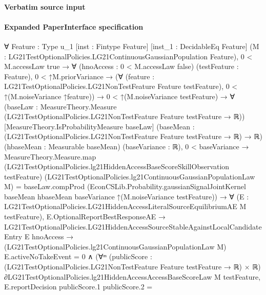 \documentclass[10pt]{article}
\begin{document}
\paragraph{Verbatim source input}
\begin{ReviewVerbatim}
\end{ReviewVerbatim}


\paragraph{Expanded PaperInterface specification}
\begin{ReviewVerbatim}
∀ {Feature : Type u_1} [inst : Fintype Feature] [inst_1 : DecidableEq Feature]
  (M : LG21TestOptionalPolicies.LG21ContinuousGaussianPopulation Feature),
  0 < M.accessLaw {true} →
    ∀ (hnoAccess : 0 < M.accessLaw {false}) (testFeature : Feature),
      0 < ↑M.priorVariance →
        (∀ (feature : LG21TestOptionalPolicies.LG21NonTestFeature Feature testFeature),
            0 < ↑(M.noiseVariance ↑feature)) →
          0 < ↑(M.noiseVariance testFeature) →
            ∀ (baseLaw : MeasureTheory.Measure (LG21TestOptionalPolicies.LG21NonTestFeature Feature testFeature → ℝ))
              [MeasureTheory.IsProbabilityMeasure baseLaw]
              (baseMean : (LG21TestOptionalPolicies.LG21NonTestFeature Feature testFeature → ℝ) → ℝ)
              (hbaseMean : Measurable baseMean) (baseVariance : ℝ),
              0 < baseVariance →
                MeasureTheory.Measure.map
                      (LG21TestOptionalPolicies.lg21HiddenAccessBaseScoreSkillObservation testFeature)
                      (LG21TestOptionalPolicies.lg21ContinuousGaussianPopulationLaw M) =
                    baseLaw.compProd
                      (EconCSLib.Probability.gaussianSignalJointKernel baseMean hbaseMean baseVariance
                        ↑(M.noiseVariance testFeature)) →
                  ∀ (E : LG21TestOptionalPolicies.LG21HiddenAccessLiteralSourceEquilibriumAE M testFeature),
                    E.OptionalReportBestResponseAE →
                      LG21TestOptionalPolicies.LG21HiddenAccessSourceStableAgainstLocalCandidateEntry E hnoAccess →
                        (LG21TestOptionalPolicies.lg21ContinuousGaussianPopulationLaw M) E.activeNoTakeEvent = 0 ∧
                          (∀ᵐ (publicScore :
                              (LG21TestOptionalPolicies.LG21NonTestFeature Feature testFeature → ℝ) ×
                                ℝ) ∂LG21TestOptionalPolicies.lg21HiddenAccessAccessBaseScoreLaw M testFeature,
                              E.reportDecision publicScore.1 publicScore.2 =

\end{ReviewVerbatim}
\end{document}
